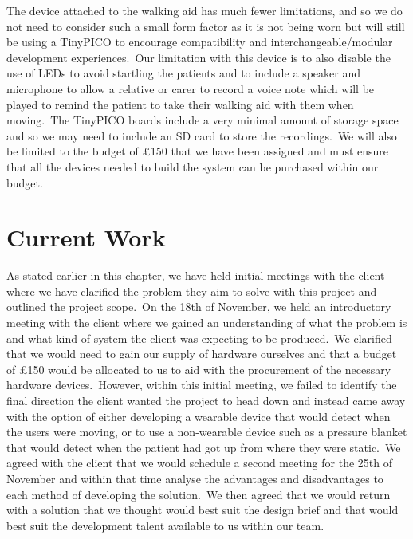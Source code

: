             The device attached to the walking aid has much fewer limitations, and so we do not need to consider such a
            small form factor as it is not being worn but will still be using a TinyPICO to encourage compatibility and
            interchangeable/modular development experiences.\ Our limitation with this device is to also disable the use
            of LEDs to avoid startling the patients and to include a speaker and microphone to allow a relative or
            carer to record a voice note which will be played to remind the patient to take their walking aid with them
            when moving.\ The TinyPICO boards include a very minimal amount of storage space and so we may need to
            include an SD card to store the recordings.\ We will also be limited to the budget of £150 that we have been
            assigned and must ensure that all the devices needed to build the system can be purchased within our budget.

    \section{Current Work}
        As stated earlier in this chapter, we have held initial meetings with the client where we have clarified the
        problem they aim to solve with this project and outlined the project scope.\ On the 18th of November, we held an
        introductory meeting with the client where we gained an understanding of what the problem is and what kind of
        system the client was expecting to be produced.\ We clarified that we would need to gain our supply of hardware
        ourselves and that a budget of £150 would be allocated to us to aid with the procurement of the necessary
        hardware devices.\ However, within this initial meeting, we failed to identify the final direction the client
        wanted the project to head down and instead came away with the option of either developing a wearable device
        that would detect when the users were moving, or to use a non-wearable device such as a pressure
        blanket that would detect when the patient had got up from where they were static.\ We agreed with the client
        that we would schedule a second meeting for the 25th of November and within that time analyse the advantages
        and disadvantages to each method of developing the solution.\ We then agreed that we would return with a solution
        that we thought would best suit the design brief and that would best suit the development talent available to us
        within our team.

